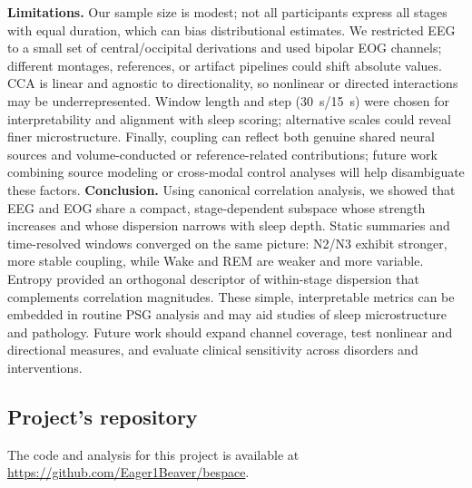 \textbf{Limitations.}
Our sample size is modest; not all participants express all stages with equal duration, which can bias distributional estimates. We restricted EEG to a small set of central/occipital derivations and used bipolar EOG channels; different montages, references, or artifact pipelines could shift absolute values. CCA is linear and agnostic to directionality, so nonlinear or directed interactions may be underrepresented. Window length and step (30~s/15~s) were chosen for interpretability and alignment with sleep scoring; alternative scales could reveal finer microstructure. Finally, coupling can reflect both genuine shared neural sources and volume-conducted or reference-related contributions; future work combining source modeling or cross-modal control analyses will help disambiguate these factors.
\FloatBarrier
\textbf{Conclusion.}
Using canonical correlation analysis, we showed that EEG and EOG share a compact, stage-dependent subspace whose strength increases and whose dispersion narrows with sleep depth. Static summaries and time-resolved windows converged on the same picture: N2/N3 exhibit stronger, more stable coupling, while Wake and REM are weaker and more variable. Entropy provided an orthogonal descriptor of within-stage dispersion that complements correlation magnitudes. These simple, interpretable metrics can be embedded in routine PSG analysis and may aid studies of sleep microstructure and pathology. Future work should expand channel coverage, test nonlinear and directional measures, and evaluate clinical sensitivity across disorders and interventions.

\subsection*{Project's repository}
The code and analysis for this project is available at \url{https://github.com/Eager1Beaver/bespace}.

\renewcommand{\baselinestretch}{1.5}



